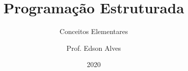 \title{Programação Estruturada}
\subtitle{Conceitos Elementares}
\date{2020}
\author{Prof. Edson Alves}
